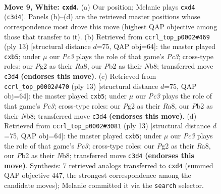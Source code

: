 \documentclass[11pt]{article}
\begin{document}
\begin{figure}[p]\centering
\begin{subfigure}{0.46\textwidth}\centering
\resizebox{\linewidth}{!}{%
\newchessgame
\chessboard[
  setfen={r1bqkb2/pp1n1ppr/2n1p3/3pP3/3p4/2P2P2/PP1N2PP/R1BQK1NR w KQq - 0 9},
  showmover=false,
  pgfstyle=straightmove, color=movearrow, markmove={c3-d4}
]}
\caption{}
\end{subfigure}\hfill
\begin{subfigure}{0.46\textwidth}\centering
\resizebox{\linewidth}{!}{%
\newchessgame
\chessboard[
  setfen={rnbqkb1r/p4ppp/2p1pn2/1P6/2pP4/4PN1P/1P3PP1/RNBQKB1R b KQkq - 0 7},
  showmover=false,
  pgfstyle=straightmove, color=movearrow, markmove={c6-b5}
]}
\caption{}
\end{subfigure}
\\[4pt]
\begin{subfigure}{0.46\textwidth}\centering
\resizebox{\linewidth}{!}{%
\newchessgame
\chessboard[
  setfen={rnbqkb1r/p4ppp/2p1pn2/1P6/2pP4/4PN1P/1P3PP1/RNBQKB1R b KQkq - 0 7},
  showmover=false,
  pgfstyle=straightmove, color=movearrow, markmove={c6-b5}
]}
\caption{}
\end{subfigure}\hfill
\begin{subfigure}{0.46\textwidth}\centering
\resizebox{\linewidth}{!}{%
\newchessgame
\chessboard[
  setfen={rnbqkb1r/p4ppp/2p1pn2/1P6/2pP4/4PN1P/1P3PP1/RNBQKB1R b KQkq - 0 7},
  showmover=false,
  pgfstyle=straightmove, color=movearrow, markmove={c6-b5}
]}
\caption{}
\end{subfigure}
\caption{\textbf{Move 9, White: \texttt{cxd4}.} (a) Our position; Melanie plays \texttt{cxd4} (\texttt{c3d4}). Panels (b)--(d) are the retrieved master positions whose correspondence most drove this move (highest QAP objective among those that transfer to it). (b) Retrieved from \texttt{ccrl\_top\_p0002\#469} (ply 13) [structural distance $d$=75, QAP obj=64]: the master played \texttt{cxb5}; under $\mu$ our \emph{Pc3} plays the role of that game's \emph{Pc3}; cross-type roles: our \emph{P}g2 as their \emph{R}a8, our \emph{P}b2 as their \emph{N}b8; transferred move \texttt{c3d4} \textbf{(endorses this move)}. (c) Retrieved from \texttt{ccrl\_top\_p0002\#470} (ply 13) [structural distance $d$=75, QAP obj=64]: the master played \texttt{cxb5}; under $\mu$ our \emph{Pc3} plays the role of that game's \emph{Pc3}; cross-type roles: our \emph{P}g2 as their \emph{R}a8, our \emph{P}b2 as their \emph{N}b8; transferred move \texttt{c3d4} \textbf{(endorses this move)}. (d) Retrieved from \texttt{ccrl\_top\_p0002\#3081} (ply 13) [structural distance $d$=75, QAP obj=64]: the master played \texttt{cxb5}; under $\mu$ our \emph{Pc3} plays the role of that game's \emph{Pc3}; cross-type roles: our \emph{P}g2 as their \emph{R}a8, our \emph{P}b2 as their \emph{N}b8; transferred move \texttt{c3d4} \textbf{(endorses this move)}. Synthesis: 7 retrieved analogs transferred to \texttt{cxd4} (summed QAP objective 447, the strongest correspondence among the candidate moves); Melanie committed it via the \texttt{search} selector.}
\label{fig:thought-m16}
\end{figure}
\end{document}
